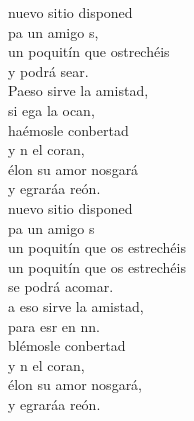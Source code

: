 \documentclass[12pt]{article}
\begin{document}
\begin{multicols*}{2}
\begin{cancion}%
	nuevo sitio disponed\\
	pa un amigo s,\\
	un poquitín que ostrechéis\\
	y podrá sear.\\
	Paeso sirve la amistad,\\
	si ega la ocan, \\
	haémosle conbertad\\
	y n el coran,\\
	élon su amor nosgará\\
	y egraráa reón.\\
	nuevo sitio disponed\\
	pa un amigo s\\
un poquitín que os estrechéis\\
un poquitín que os estrechéis\\
	se podrá acomar.\\
	a eso sirve la amistad,\\
	para esr en nn.\\
	blémosle conbertad\\
	y n el coran,\\
	élon su amor nosgará,\\
	y egraráa reón.\\
\end{cancion}%


\end{multicols*}
\end{document}
